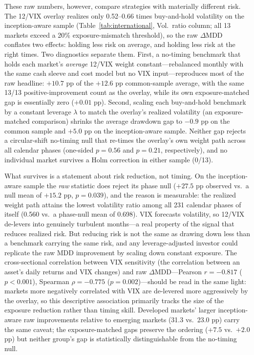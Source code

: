 These raw numbers, however, compare strategies with materially different risk. The 12/VIX overlay realizes only 0.52--0.66 times buy-and-hold volatility on the inception-aware sample (Table~\ref{tab:international}, Vol.\ ratio column; all 13 markets exceed a 20\% exposure-mismatch threshold), so the raw $\Delta$MDD conflates two effects: holding less risk on average, and holding less risk at the right times. Two diagnostics separate them. First, a no-timing benchmark that holds each market's \emph{average} 12/VIX weight constant---rebalanced monthly with the same cash sleeve and cost model but no VIX input---reproduces most of the raw headline: $+10.7$ pp of the $+12.6$ pp common-sample average, with the same 13/13 positive-improvement count as the overlay, while its own exposure-matched gap is essentially zero ($+0.01$ pp). Second, scaling each buy-and-hold benchmark by a constant leverage $\lambda$ to match the overlay's realized volatility (an exposure-matched comparison) shrinks the average drawdown gap to $-0.9$ pp on the common sample and $+5.0$ pp on the inception-aware sample. Neither gap rejects a circular-shift no-timing null that re-times the overlay's own weight path across all calendar phases (one-sided $p = 0.56$ and $p = 0.21$, respectively), and no individual market survives a Holm correction in either sample (0/13).

What survives is a statement about risk reduction, not timing. On the inception-aware sample the \emph{raw} statistic does reject its phase null ($+27.5$ pp observed vs.\ a null mean of $+15.2$ pp, $p = 0.039$), and the reason is measurable: the realized weight path attains the lowest volatility ratio among all 231 calendar phases of itself (0.560 vs.\ a phase-null mean of 0.698). VIX forecasts volatility, so 12/VIX de-levers into genuinely turbulent months---a real property of the signal that reduces realized risk. But reducing risk is not the same as drawing down less than a benchmark carrying the same risk, and any leverage-adjusted investor could replicate the raw MDD improvement by scaling down constant exposure. The cross-sectional correlation between VIX sensitivity (the correlation between an asset's daily returns and VIX changes) and raw $\Delta$MDD---Pearson $r = -0.817$ ($p < 0.001$), Spearman $\rho = -0.775$ ($p = 0.002$)---should be read in the same light: markets more negatively correlated with VIX are de-levered more aggressively by the overlay, so this descriptive association primarily tracks the size of the exposure reduction rather than timing skill. Developed markets' larger inception-aware raw improvements relative to emerging markets (31.3 vs.\ 23.0 pp) carry the same caveat; the exposure-matched gaps preserve the ordering ($+7.5$ vs.\ $+2.0$ pp) but neither group's gap is statistically distinguishable from the no-timing null.


